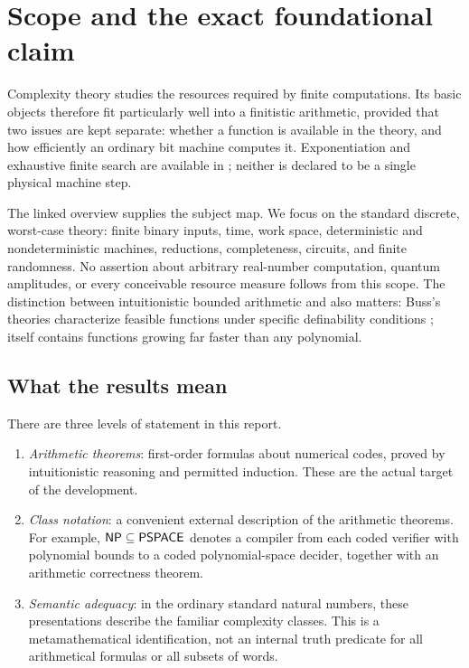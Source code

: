 \section{Scope and the exact foundational claim}

Complexity theory studies the resources required by finite computations. Its
basic objects therefore fit particularly well into a finitistic arithmetic,
provided that two issues are kept separate: whether a function is available in
the theory, and how efficiently an ordinary bit machine computes it.
Exponentiation and exhaustive finite search are available in \ipra; neither is
declared to be a single physical machine step.

The linked overview \cite{WikiComplexity} supplies the subject map. We focus on
the standard discrete, worst-case theory: finite binary inputs, time, work
space, deterministic and nondeterministic machines, reductions, completeness,
circuits, and finite randomness. No assertion about arbitrary real-number
computation, quantum amplitudes, or every conceivable resource measure follows
from this scope. The distinction between intuitionistic bounded arithmetic and
\ipra{} also matters: Buss's theories characterize feasible functions under
specific definability conditions \cite{Buss1986}; \ipra{} itself contains
functions growing far faster than any polynomial.

\subsection{What the results mean}

There are three levels of statement in this report.
\begin{enumerate}
\item \emph{Arithmetic theorems}: first-order formulas about numerical codes,
proved by intuitionistic reasoning and permitted induction. These are the
actual target of the development.
\item \emph{Class notation}: a convenient external description of the
arithmetic theorems. For example, \(\mathsf{NP}\subseteq\mathsf{PSPACE}\) denotes a compiler
from each coded verifier with polynomial bounds to a coded polynomial-space
decider, together with an arithmetic correctness theorem.
\item \emph{Semantic adequacy}: in the ordinary standard natural numbers,
these presentations describe the familiar complexity classes. This is a
metamathematical identification, not an internal truth predicate for all
arithmetical formulas or all subsets of words.
\end{enumerate}

